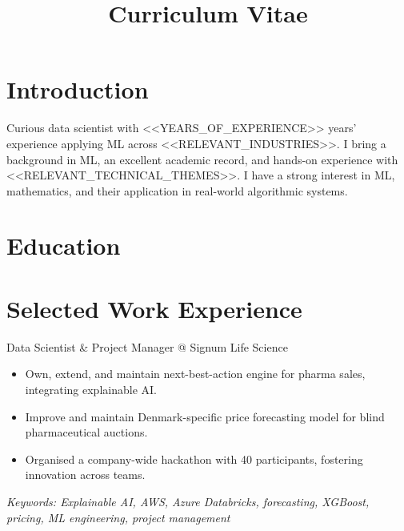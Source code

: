 \documentclass[11pt,a4paper]{moderncv}
\title{Curriculum Vitae}
\begin{document}
\makecvtitle

\section*{Introduction}
Curious data scientist with <<YEARS_OF_EXPERIENCE>> years' experience applying ML across <<RELEVANT_INDUSTRIES>>. I bring a background in ML, an excellent academic record, and hands-on experience with <<RELEVANT_TECHNICAL_THEMES>>. I have a strong interest in ML, mathematics, and their application in real-world algorithmic systems.

\section{Education}




\section{Selected Work Experience}

\large{Data Scientist \& Project Manager @ Signum Life Science}
\normalsize
\begin{itemize}
\item Own, extend, and maintain next-best-action engine for pharma sales, integrating explainable AI.
\item Improve and maintain Denmark-specific price forecasting model for blind pharmaceutical auctions.
\item Organised a company-wide hackathon with 40 participants, fostering innovation across teams.
\end{itemize}

{\footnotesize\textit{Keywords: Explainable AI, AWS, Azure Databricks, forecasting, XGBoost, pricing, ML engineering, project management}}
\end{document}
